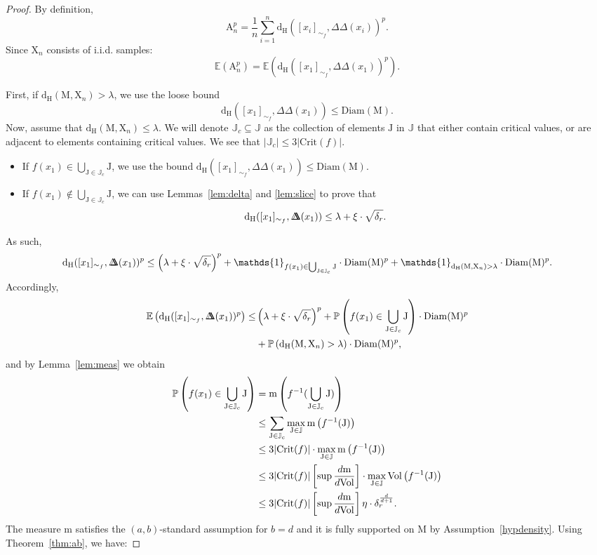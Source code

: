 \documentclass[pdflatex,sn-mathphys-ay]{sn-jnl}%
\newcommand{\man}{\mathrm{M}}
\newcommand{\sample}{\mathrm{X}}
\newcommand{\mes}{\mathrm{m}}
\newcommand{\critic}{{\mathrm {Crit}}}
\newcommand{\appr}{{\mathrm {A}}}
\newcommand{\haus}{{\mathrm {d_H}}}
\newcommand{\DD}{\Delta\!\!\!\!\Delta}
\newcommand{\diam}{\mathrm{Diam}}
\newcommand{\vol}{\mathrm{Vol}}
\newcommand{\ind}{\mathds{1}}
\newcommand{\coverwidth}{\change{\delta_r}}
\newcommand{\preim}[2]{#1^{-1}(#2)}
\newcommand{\change}[1]{\noindent #1}
\theoremstyle{thmstyleone}%
\begin{document}
\begin{proof}
By definition,
$$\appr_n^p=\frac{1}{n}\sum_{i=1}^n\haus([x_i]_{\sim_f},\DD(x_i))^p.$$
Since $\sample_n$ consists of i.i.d. samples:
$$\mathbb{E}\left(\appr_n^p\right)=\mathbb{E}\left(\haus([x_1]_{\sim_f},\DD(x_1))^p\right).$$


First, if $\haus(\man,\sample_n)>\lambda$, we use the loose bound $$\haus([x_1]_{\sim_f},\DD(x_1))\leq\diam(\man).$$
Now, assume that $\haus(\man,\sample_n)\leq\lambda$.
We will denote $\mathbb{J}_c\subseteq\mathbb{J}$ as the collection of elements $\mathrm{J}$ in $\mathbb{J}$ that either contain critical values, or are adjacent to elements containing critical values. We see that $|\mathbb{J}_c|\leq 3|\critic(f)|$.

\begin{itemize}
	\item If $f(x_1)\in \bigcup_{\mathrm{J}\in  \mathbb{J}_c} \mathrm{J} $, we use the bound $\haus([x_1]_{\sim_f},\DD(x_1))\leq\diam(\man)$.
    \item If $f(x_1) \notin \bigcup_{\mathrm{J}\in  \mathbb{J}_c} \mathrm{J}  $, we can use Lemmas~\ref{lem:delta} and \ref{lem:slice} to prove that
    $$\haus([x_1]_{\sim_f},\DD(x_1))\leq\lambda+\xi\cdot\sqrt{\coverwidth}.$$
\end{itemize}


As such,
$$\haus([x_1]_{\sim_f},\DD(x_1))^p\leq
\left(\lambda+\xi\cdot\sqrt{\coverwidth}\right)^p+
\ind_{f(x_1) \in \bigcup_{\mathrm{J}\in  \mathbb{J}_c} \mathrm{J} }\cdot \diam(\man)^p+\ind_{\haus(\man,\sample_n)>\lambda}\cdot \diam(\man)^p.$$
Accordingly,
\begin{align*}
    \mathbb{E}\left(\haus([x_1]_{\sim_f},\DD(x_1))^p\right)\leq&
    \left(\lambda+\xi\cdot\sqrt{\coverwidth}\right)^p+
    \mathbb{P}\left(f(x_1) \in \bigcup_{\mathrm{J}\in  \mathbb{J}_c} \mathrm{J} \right)\cdot \diam(\man)^p\\
    &+\mathbb{P}\left(\haus(\man,\sample_n)>\lambda\right)\cdot \diam(\man)^p,
\end{align*}
and by Lemma~\ref{lem:meas} we obtain
\begin{align*}
    \mathbb{P}\left(f(x_1) \in \bigcup_{\mathrm{J}\in  \mathbb{J}_c} \mathrm{J}  \right)&=\mes\left( \preim{f}{\bigcup_{\mathrm{J}\in\mathbb{J}_c}\mathrm{J}}\right)\\
    &\leq \sum_{\mathrm{J}\in\mathbb{J}_c} \max_{\mathrm{J}\in\mathbb{J}}\mes\left( \preim{f}{\mathrm{J}}\right)\\
    &\leq 3|\critic(f)|\cdot\max_{\mathrm{J}\in\mathbb{J}}\mes\left(\preim{f}{\mathrm{J}}\right)\\
    &\leq 3|\critic(f)|\left[\sup\frac{d\mes}{d\vol}\right]\cdot\max_{\mathrm{J}\in\mathbb{J}}\vol\left(\preim{f}{\mathrm{J}}\right)\\
    &\leq 3|\critic(f)|\left[\sup\frac{d\mes}{d\vol}\right]\eta\cdot\coverwidth^{\frac{d}{d+1}}.
\end{align*}
The measure $\mes$ satisfies the $(a,b)$-standard assumption for $b=d$ and it is fully supported on $\man$ by Assumption~\ref{hypdensity}. Using Theorem~\ref{thm:ab}, we have:


\end{proof}
\end{document}

